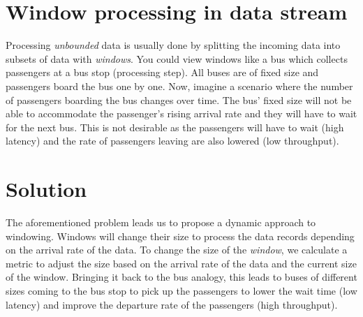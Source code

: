 \section*{Window processing in data stream}

Processing \emph{unbounded} data is usually done by splitting the 
incoming data into subsets of data with \emph{windows}. You could view
windows like a bus which collects passengers at a 
bus stop (processing step). All buses are of fixed size and passengers board
the bus one by one. Now, imagine a scenario where the number of passengers
boarding the bus changes over time. The bus' fixed size will not be able 
to accommodate the passenger's rising arrival rate and they will have to wait for the
next bus. This is not desirable as the passengers will have 
to wait (high latency) 
and the rate of passengers leaving are also lowered (low throughput).


\section*{Solution}
The aforementioned problem leads us to propose a dynamic approach 
to windowing. Windows will change their size to process the data 
records depending on the arrival rate of the data. 
To change the size of the \emph{window}, we calculate a metric 
to adjust the size based on the arrival rate of the data and the 
current size of the window. Bringing it back to the bus analogy, 
this leads to buses of different sizes coming to the bus stop to 
pick up the passengers to lower the wait time (low latency) and 
improve the departure rate of the passengers (high throughput). 
